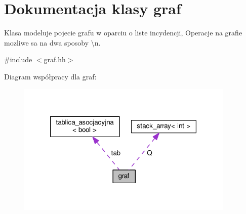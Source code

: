 \hypertarget{classgraf}{\section{Dokumentacja klasy graf}
\label{classgraf}
}


Klasa modeluje pojecie grafu w oparciu o liste incydencji, Operacje na grafie mozliwe sa na dwa sposoby \textbackslash{}n.  




{\ttfamily \#include $<$graf.\-hh$>$}



Diagram współpracy dla graf\-:\nopagebreak
\begin{figure}[H]
\begin{center}
\leavevmode
\includegraphics[width=295pt]{classgraf__coll__graph}
\end{center}
\end{figure}
